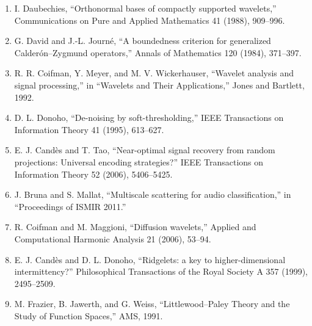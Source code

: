 \begin{enumerate}
\item I. Daubechies, ``Orthonormal bases of compactly supported wavelets,'' Communications on Pure and Applied Mathematics 41 (1988), 909--996.
\item G. David and J.-L. Journ\'e, ``A boundedness criterion for generalized Calder\'on--Zygmund operators,'' Annals of Mathematics 120 (1984), 371--397.
\item R. R. Coifman, Y. Meyer, and M. V. Wickerhauser, ``Wavelet analysis and signal processing,'' in ``Wavelets and Their Applications,'' Jones and Bartlett, 1992.
\item D. L. Donoho, ``De-noising by soft-thresholding,'' IEEE Transactions on Information Theory 41 (1995), 613--627.
\item E. J. Cand\`es and T. Tao, ``Near-optimal signal recovery from random projections: Universal encoding strategies?'' IEEE Transactions on Information Theory 52 (2006), 5406--5425.
\item J. Bruna and S. Mallat, ``Multiscale scattering for audio classification,'' in ``Proceedings of ISMIR 2011.''
\item R. Coifman and M. Maggioni, ``Diffusion wavelets,'' Applied and Computational Harmonic Analysis 21 (2006), 53--94.
\item E. J. Cand\`es and D. L. Donoho, ``Ridgelets: a key to higher-dimensional intermittency?'' Philosophical Transactions of the Royal Society A 357 (1999), 2495--2509.
\item M. Frazier, B. Jawerth, and G. Weiss, ``Littlewood--Paley Theory and the Study of Function Spaces,'' AMS, 1991.
\end{enumerate}

